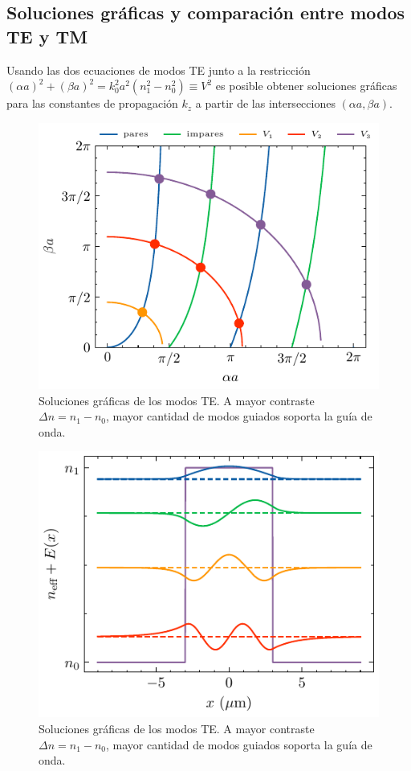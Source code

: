 \subsection{Soluciones gráficas y comparación entre modos TE y TM}

Usando las dos ecuaciones de modos TE junto a la restricción $(\alpha a)^2 + (\beta a)^2 = k_0^2 a^2(n_1^2 - n_0^2) \equiv V^2$ es posible obtener soluciones gráficas para las constantes de propagación $k_z$ a partir de las intersecciones $(\alpha a, \beta a)$. 

\begin{figure}[H]
	\centering
	\includegraphics[width=0.7\linewidth]{media/slabgraphical.pdf}
	\caption[Soluciones gráficas de los modos TE]{Soluciones gráficas de los modos TE. A mayor contraste $\Delta n = n_1-n_0$, mayor cantidad de modos guiados soporta la guía de onda.}
\end{figure}

\begin{figure}[H]
	\centering
	\includegraphics[width=0.7\linewidth]{media/TETMfields.pdf}
	\caption[Soluciones gráficas de los modos TE]{Soluciones gráficas de los modos TE. A mayor contraste $\Delta n = n_1-n_0$, mayor cantidad de modos guiados soporta la guía de onda.}
\end{figure}

